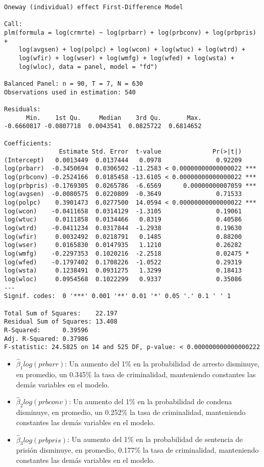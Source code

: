 \documentclass[
  12pt,
]{article}
\begin{document}
\begin{verbatim}
Oneway (individual) effect First-Difference Model

Call:
plm(formula = log(crmrte) ~ log(prbarr) + log(prbconv) + log(prbpris) + 
    log(avgsen) + log(polpc) + log(wcon) + log(wtuc) + log(wtrd) + 
    log(wfir) + log(wser) + log(wmfg) + log(wfed) + log(wsta) + 
    log(wloc), data = panel, model = "fd")

Balanced Panel: n = 90, T = 7, N = 630
Observations used in estimation: 540

Residuals:
      Min.    1st Qu.     Median    3rd Qu.       Max. 
-0.6660817 -0.0807718  0.0043541  0.0825722  0.6814652 

Coefficients:
               Estimate Std. Error  t-value              Pr(>|t|)    
(Intercept)   0.0013449  0.0137444   0.0978               0.92209    
log(prbarr)  -0.3450694  0.0306502 -11.2583 < 0.00000000000000022 ***
log(prbconv) -0.2524166  0.0185458 -13.6105 < 0.00000000000000022 ***
log(prbpris) -0.1769305  0.0265786  -6.6569      0.00000000007059 ***
log(avgsen)  -0.0080575  0.0220809  -0.3649               0.71533    
log(polpc)    0.3901473  0.0277500  14.0594 < 0.00000000000000022 ***
log(wcon)    -0.0411658  0.0314129  -1.3105               0.19061    
log(wtuc)     0.0111858  0.0134466   0.8319               0.40586    
log(wtrd)    -0.0411234  0.0317844  -1.2938               0.19630    
log(wfir)     0.0032492  0.0218791   0.1485               0.88200    
log(wser)     0.0165830  0.0147935   1.1210               0.26282    
log(wmfg)    -0.2297353  0.1020216  -2.2518               0.02475 *  
log(wfed)    -0.1797402  0.1708226  -1.0522               0.29319    
log(wsta)     0.1238491  0.0931275   1.3299               0.18413    
log(wloc)     0.0954568  0.1022299   0.9337               0.35086    
---
Signif. codes:  0 '***' 0.001 '**' 0.01 '*' 0.05 '.' 0.1 ' ' 1

Total Sum of Squares:    22.197
Residual Sum of Squares: 13.408
R-Squared:      0.39596
Adj. R-Squared: 0.37986
F-statistic: 24.5825 on 14 and 525 DF, p-value: < 0.000000000000000222
\end{verbatim}

\begin{itemize}
\item
  \(\hat{\beta}_1log(prbarr)\): Un aumento del 1\% en la probabilidad de
  arresto disminuye, en promedio, un 0.345\% la tasa de criminalidad,
  manteniendo constantes las demás variables en el modelo.
\item
  \(\hat{\beta}_2log(prbconv)\): Un aumento del 1\% en la probabilidad
  de condena disminuye, en promedio, un 0.252\% la tasa de criminalidad,
  manteniendo constantes las demás variables en el modelo.
\item
  \(\hat{\beta}_3log(prbpris)\): Un aumento del 1\% en la probabilidad
  de sentencia de prisión disminuye, en promedio, 0.177\% la tasa de
  criminalidad, manteniendo constantes las demás variables en el modelo.
\end{itemize}
\end{document}
